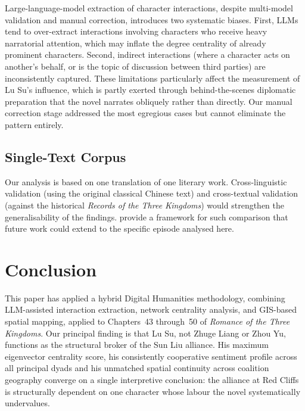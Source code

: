\documentclass[12pt, a4paper]{article}
\newcommand{\booktitle}[1]{\textit{#1}}
\begin{document}
Large-language-model extraction of character interactions, despite
multi-model validation and manual correction, introduces two systematic
biases.
First, LLMs tend to over-extract interactions involving characters who
receive heavy narratorial attention, which may inflate the degree
centrality of already prominent characters.
Second, indirect interactions (where a character acts on another's
behalf, or is the topic of discussion between third parties) are
inconsistently captured.
These limitations particularly affect the measurement of Lu Su's
influence, which is partly exerted through behind-the-scenes diplomatic
preparation that the novel narrates obliquely rather than directly.
Our manual correction stage addressed the most egregious cases but cannot
eliminate the pattern entirely.

\subsection{Single-Text Corpus}

Our analysis is based on one translation of one literary work.
Cross-linguistic validation (using the original classical Chinese text)
and cross-textual validation (against the historical \booktitle{Records
of the Three Kingdoms}) would strengthen the generalisability of the
findings.
\textcite{zhang2021complicating} provide a framework for such comparison
that future work could extend to the specific episode analysed here.

\section{Conclusion}
\label{sec:conclusion}

This paper has applied a hybrid Digital Humanities methodology, combining
LLM-assisted interaction extraction, network centrality analysis, and
GIS-based spatial mapping, applied to Chapters~43 through~50 of
\booktitle{Romance of the Three Kingdoms}.
Our principal finding is that Lu Su, not Zhuge Liang or Zhou Yu, functions
as the structural broker of the Sun Liu alliance.
His maximum eigenvector centrality score, his consistently cooperative
sentiment profile across all principal dyads and his unmatched spatial
continuity across coalition geography converge on a single interpretive
conclusion: the alliance at Red Cliffs is structurally dependent on one
character whose labour the novel systematically undervalues.
\end{document}
